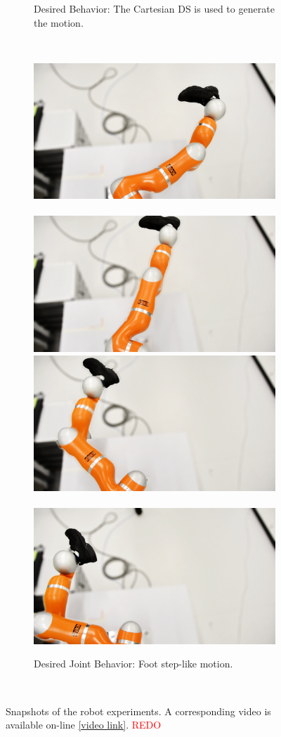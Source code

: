 \documentclass[letterpaper, 10 pt, conference,fleqn]{ieeeconf}
\begin{document}
\begin{figure}[t]
\begin{subfigure}[t]{\linewidth}
		\caption{Desired Behavior: The Cartesian DS is used to generate the motion.}
		\label{fig:snapshot:b}
	\end{subfigure}\\
	\begin{subfigure}[t]{\linewidth}
		\centering	
		\includegraphics[angle=180,origin=c,width=0.45\linewidth]{Pic/1.png}~~
		\includegraphics[angle=180,origin=c,width=0.45\linewidth]{Pic/3.png}\\\vspace{0.1cm}
		\includegraphics[angle=180,origin=c,width=0.45\linewidth]{Pic/4.png}~~
		\includegraphics[angle=180,origin=c,width=0.45\linewidth]{Pic/2.png}
		\caption{Desired Joint Behavior: Foot step-like motion.}
		\label{fig:snapshot:c}
	\end{subfigure}\\	
	\caption{Snapshots of the robot experiments. A corresponding video is available on-line \href{https://youtu.be/1dgKfmN1UgE}{[video link]}. \textcolor{red}{REDO} }
	\label{fig:snapshot}
	\vspace{-10pt}
\end{figure}
\end{document}
